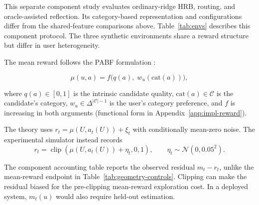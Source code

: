 \documentclass{article} %
\begin{document}
\label{sec:exp-setup}

This separate component study evaluates ordinary-ridge HRB, routing, and
oracle-assisted reflection. Its category-based representation and
configurations differ from the shared-feature comparisons above.
Table~\ref{tab:envs} describes this component protocol.
The three synthetic environments share a reward structure but differ in
user heterogeneity.

The mean reward follows the PABF formulation \citep{jin2026personalizing}:

\begin{equation}
\label{eq:exp-mu}
\mu(u,a) = f\bigl(q(a),\; w_u(\mathrm{cat}(a))\bigr),
\end{equation}

where $q(a)\in[0,1]$ is the intrinsic candidate quality, $\mathrm{cat}(a)\in\mathcal{C}$ is the candidate's category, $w_u\in\Delta^{|\mathcal{C}|-1}$ is the user's category preference, and $f$ is increasing in both arguments (functional form in Appendix~\ref{app:impl-reward}).

The theory uses $r_t=\mu(U,a_t(U))+\xi_t$ with conditionally mean-zero noise. The experimental simulator instead records
\begin{equation}
\label{eq:exp-clipped-reward}
r_t=\operatorname{clip}\!\left(\mu(U,a_t(U))+\eta_t,0,1\right),
\qquad
\eta_t\sim\mathcal N(0,0.05^2).
\end{equation}

The component accounting table reports the observed residual \(m_t-r_t\),
unlike the mean-reward endpoint in Table~\ref{tab:geometry-controls}.
Clipping can make the residual biased for the pre-clipping mean-reward
exploration cost. In a deployed system, \(m_t(u)\) would also require
held-out estimation.
\end{document}
